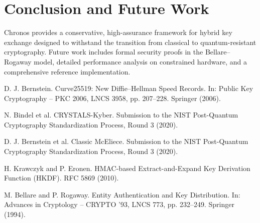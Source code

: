 \documentclass[runningheads]{llncs}
\begin{document}
\section{Conclusion and Future Work}
Chronos provides a conservative, high-assurance framework for hybrid key exchange designed to withstand the transition from classical to quantum-resistant cryptography. Future work includes formal security proofs in the Bellare--Rogaway model, detailed performance analysis on constrained hardware, and a comprehensive reference implementation.

\begin{thebibliography}{9}
D. J. Bernstein. Curve25519: New Diffie--Hellman Speed Records. In: Public Key Cryptography -- PKC 2006, LNCS 3958, pp. 207--228. Springer (2006).

N. Bindel et al. CRYSTALS-Kyber. Submission to the NIST Post-Quantum Cryptography Standardization Process, Round 3 (2020).

D. J. Bernstein et al. Classic McEliece. Submission to the NIST Post-Quantum Cryptography Standardization Process, Round 3 (2020).

H. Krawczyk and P. Eronen. HMAC-based Extract-and-Expand Key Derivation Function (HKDF). RFC 5869 (2010).

M. Bellare and P. Rogaway. Entity Authentication and Key Distribution. In: Advances in Cryptology -- CRYPTO '93, LNCS 773, pp. 232--249. Springer (1994).
\end{thebibliography}
\end{document}
